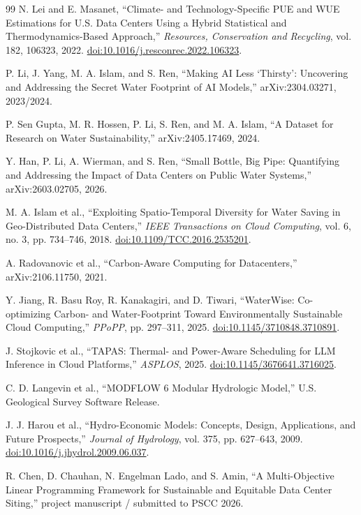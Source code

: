 \documentclass[11pt]{article}
\begin{document}
\begin{thebibliography}{99}
N. Lei and E. Masanet,
``Climate- and Technology-Specific PUE and WUE Estimations for U.S. Data Centers Using a Hybrid Statistical and Thermodynamics-Based Approach,''
\emph{Resources, Conservation and Recycling}, vol. 182, 106323, 2022.
\href{https://doi.org/10.1016/j.resconrec.2022.106323}{doi:10.1016/j.resconrec.2022.106323}.

P. Li, J. Yang, M. A. Islam, and S. Ren,
``Making AI Less `Thirsty': Uncovering and Addressing the Secret Water Footprint of AI Models,''
arXiv:2304.03271, 2023/2024.

P. Sen Gupta, M. R. Hossen, P. Li, S. Ren, and M. A. Islam,
``A Dataset for Research on Water Sustainability,''
arXiv:2405.17469, 2024.

Y. Han, P. Li, A. Wierman, and S. Ren,
``Small Bottle, Big Pipe: Quantifying and Addressing the Impact of Data Centers on Public Water Systems,''
arXiv:2603.02705, 2026.

M. A. Islam et al.,
``Exploiting Spatio-Temporal Diversity for Water Saving in Geo-Distributed Data Centers,''
\emph{IEEE Transactions on Cloud Computing}, vol. 6, no. 3, pp. 734--746, 2018.
\href{https://doi.org/10.1109/TCC.2016.2535201}{doi:10.1109/TCC.2016.2535201}.

A. Radovanovic et al.,
``Carbon-Aware Computing for Datacenters,''
arXiv:2106.11750, 2021.

Y. Jiang, R. Basu Roy, R. Kanakagiri, and D. Tiwari,
``WaterWise: Co-optimizing Carbon- and Water-Footprint Toward Environmentally Sustainable Cloud Computing,''
\emph{PPoPP}, pp. 297--311, 2025.
\href{https://doi.org/10.1145/3710848.3710891}{doi:10.1145/3710848.3710891}.

J. Stojkovic et al.,
``TAPAS: Thermal- and Power-Aware Scheduling for LLM Inference in Cloud Platforms,''
\emph{ASPLOS}, 2025.
\href{https://doi.org/10.1145/3676641.3716025}{doi:10.1145/3676641.3716025}.

C. D. Langevin et al.,
``MODFLOW 6 Modular Hydrologic Model,''
U.S. Geological Survey Software Release.

J. J. Harou et al.,
``Hydro-Economic Models: Concepts, Design, Applications, and Future Prospects,''
\emph{Journal of Hydrology}, vol. 375, pp. 627--643, 2009.
\href{https://doi.org/10.1016/j.jhydrol.2009.06.037}{doi:10.1016/j.jhydrol.2009.06.037}.

R. Chen, D. Chauhan, N. Engelman Lado, and S. Amin,
``A Multi-Objective Linear Programming Framework for Sustainable and Equitable Data Center Siting,''
project manuscript / submitted to PSCC 2026.

\end{thebibliography}
\end{document}
